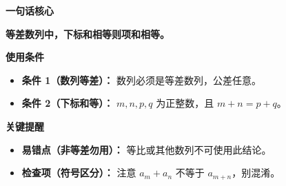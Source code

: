 \begin{summarybox}
\textbf{\textcolor{CSummary}{一句话核心}}

\textbf{等差数列中，下标和相等则项和相等。}

\medskip
\textbf{\textcolor{CSummary}{使用条件}}
\begin{itemize}[leftmargin=*, itemsep=0.5em, topsep=0.4em]
    \item \textbf{条件 1（数列等差）：} 数列必须是等差数列，公差任意。
    \item \textbf{条件 2（下标和等）：} $m,n,p,q$ 为正整数，且 $m+n = p+q$。
\end{itemize}

\medskip
\textbf{\textcolor{CSummary}{关键提醒}}
\begin{itemize}[leftmargin=*, itemsep=0.5em, topsep=0.4em]
    \item \textbf{易错点（非等差勿用）：} 等比或其他数列不可使用此结论。
    \item \textbf{检查项（符号区分）：} 注意 $a_m + a_n$ 不等于 $a_{m+n}$，别混淆。
\end{itemize}
\end{summarybox}
